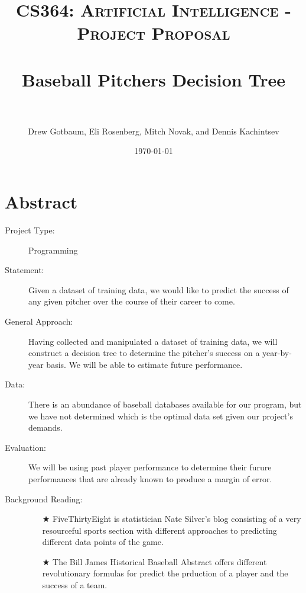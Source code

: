 \documentclass[paper=a4, fontsize=11pt]{scrartcl} %
\title{	
\normalfont \normalsize 
\textsc{CS364: Artificial Intelligence - Project Proposal} \\ [25pt] %
\horrule{0.5pt} \\[0.4cm] %
\huge Baseball Pitchers Decision Tree\\ %
\horrule{2pt} \\[0.5cm] %
}
\author{Drew Gotbaum, Eli Rosenberg, Mitch Novak, and Dennis Kachintsev} %
\date{\normalsize\today} %
\numberwithin{equation}{section} %
\numberwithin{figure}{section} %
\numberwithin{table}{section} %
\begin{document}
\maketitle %

\section*{Abstract}
\begin{description}
\item[Project Type:] Programming
\item[Statement:] Given a dataset of training data, we would like to predict the success of any given pitcher over the course of their career to come.
\item[General Approach:] Having collected and manipulated a dataset of training data, we will construct a decision tree  to determine the pitcher's success on a year-by-year basis. We will be able to estimate future performance.
\item[Data:] There is an abundance of baseball databases available for our program, but we have not determined which is the optimal data set given our project's demands.
\item[Evaluation:] We will be using past player performance to determine their furure performances that are already known to produce a margin of error.
\item[Background Reading:] \hfill \begin{itemize}
 \item[$\bigstar$] FiveThirtyEight is statistician Nate Silver's blog consisting of a very resourceful sports section with different approaches to predicting different data points of the game.
 \item[$\bigstar$] The Bill James Historical Baseball Abstract offers different revolutionary formulas for predict the prduction of a player and the success of a team.
 \end{itemize}
\end{description}
\end{document}
